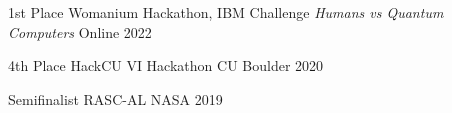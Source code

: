 
\begin{cvhonors}
  \cvhonor
    {1st Place} 
    {Womanium Hackathon, IBM Challenge \textit{Humans vs Quantum Computers}}
    {Online}
    {2022}

  \cvhonor
    {4th Place} 
    {HackCU VI Hackathon}
    {CU Boulder}
    {2020}

  \cvhonor
    {Semifinalist} 
    {RASC-AL}
    {NASA}
    {2019}


\end{cvhonors}